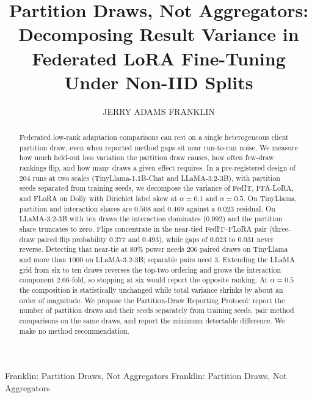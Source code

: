 \documentclass{ieeeaccess}
\begin{document}

\title{Partition Draws, Not Aggregators: Decomposing Result Variance in Federated LoRA Fine-Tuning Under Non-IID Splits}

\author{\uppercase{Jerry Adams Franklin}}

\address[1]{Independent Researcher, Rochester, NY, USA}

\tfootnote{}

\markboth
{Franklin: Partition Draws, Not Aggregators}
{Franklin: Partition Draws, Not Aggregators}


\begin{abstract}
Federated low-rank adaptation comparisons can rest on a single heterogeneous
client partition draw, even when reported method gaps sit near run-to-run noise. We measure how much
held-out loss variation the partition draw causes, how often few-draw rankings flip, and
how many draws a given effect requires. In a pre-registered design of $204$ runs at two
scales (TinyLlama-1.1B-Chat and LLaMA-3.2-3B), with partition seeds separated from
training seeds, we decompose the variance of FedIT, FFA-LoRA, and FLoRA on Dolly with
Dirichlet label skew at $\alpha{=}0.1$ and $\alpha{=}0.5$. On TinyLlama, partition and
interaction shares are $0.508$ and $0.469$ against a $0.023$ residual. On LLaMA-3.2-3B
with ten draws the interaction dominates ($0.992$) and the partition share truncates to
zero. Flips concentrate in the near-tied FedIT--FLoRA pair (three-draw paired flip
probability $0.377$ and $0.493$), while gaps of $0.023$ to $0.031$ never reverse.
Detecting that near-tie at 80\% power needs $206$ paired draws on TinyLlama and more than
$1000$ on LLaMA-3.2-3B; separable pairs need $3$. Extending the LLaMA grid from six to ten
draws reverses the top-two ordering and grows the interaction component $2.66$-fold, so
stopping at six would report the opposite ranking. At $\alpha{=}0.5$ the composition is
statistically unchanged while total variance shrinks by about an order of magnitude. We
propose the Partition-Draw Reporting Protocol: report the number of partition draws and
their seeds separately from training seeds, pair method comparisons on the same draws, and
report the minimum detectable difference. We make no method recommendation.
\end{abstract}
\end{document}
